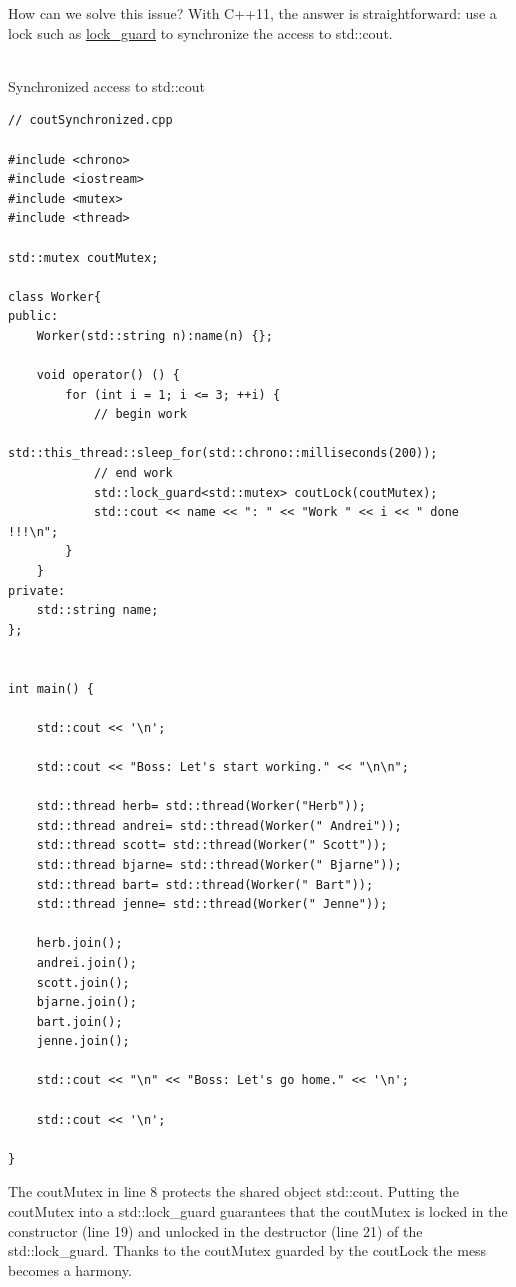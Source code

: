 How can we solve this issue? With C++11, the answer is straightforward: use a lock such as \href{https://en.cppreference.com/w/cpp/thread/lock_guard}{lock\_guard} to synchronize the access to std::cout.

\hspace*{\fill} \\ %
\noindent
Synchronized access to std::cout
\begin{lstlisting}[style=styleCXX]
// coutSynchronized.cpp

#include <chrono>
#include <iostream>
#include <mutex>
#include <thread>

std::mutex coutMutex;

class Worker{
public:
	Worker(std::string n):name(n) {};
	
	void operator() () {
		for (int i = 1; i <= 3; ++i) {
			// begin work
			std::this_thread::sleep_for(std::chrono::milliseconds(200));
			// end work
			std::lock_guard<std::mutex> coutLock(coutMutex);
			std::cout << name << ": " << "Work " << i << " done !!!\n";
		}
	}
private:
	std::string name;
};


int main() {

	std::cout << '\n';
	
	std::cout << "Boss: Let's start working." << "\n\n";
	
	std::thread herb= std::thread(Worker("Herb"));
	std::thread andrei= std::thread(Worker(" Andrei"));
	std::thread scott= std::thread(Worker(" Scott"));
	std::thread bjarne= std::thread(Worker(" Bjarne"));
	std::thread bart= std::thread(Worker(" Bart"));
	std::thread jenne= std::thread(Worker(" Jenne"));
	
	herb.join();
	andrei.join();
	scott.join();
	bjarne.join();
	bart.join();
	jenne.join();
	
	std::cout << "\n" << "Boss: Let's go home." << '\n';
	
	std::cout << '\n';

}
\end{lstlisting}

The coutMutex in line 8 protects the shared object std::cout. Putting the coutMutex into a std::lock\_guard guarantees that the coutMutex is locked in the constructor (line 19) and unlocked in the destructor (line 21) of the std::lock\_guard. Thanks to the coutMutex guarded by the coutLock the mess becomes a harmony.

